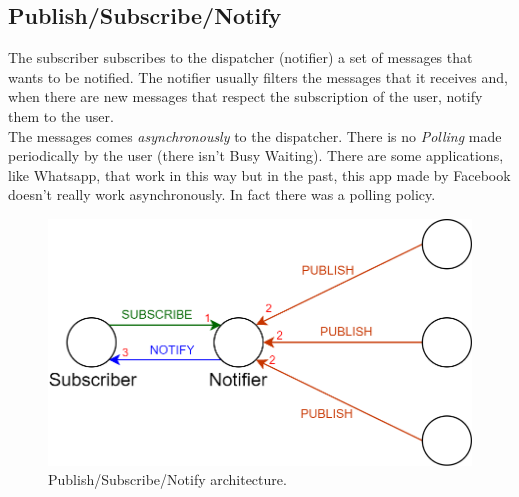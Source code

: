\subsection{Publish/Subscribe/Notify}
The subscriber subscribes to the dispatcher (notifier) a set of messages that wants to be notified. The notifier usually filters the messages that it receives and, when there are new messages that respect the subscription of the user, notify them to the user.\\ The messages comes \textit{asynchronously} to the dispatcher. There is no \textit{Polling} made periodically by the user (there isn't Busy Waiting). There are some applications, like Whatsapp, that work in this way but in the past, this app made by Facebook doesn't really work asynchronously. In fact there was a polling policy.
\begin{figure}[h]
\centering
\includegraphics[scale=0.4]{Images/OSI/publish_subscribe}
\caption{\footnotesize{Publish/Subscribe/Notify architecture.}}\label{publish_subscribe}
\end{figure}